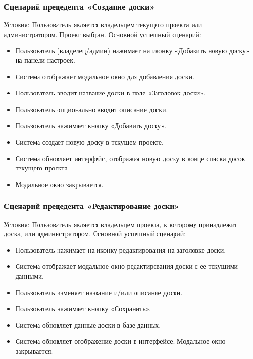 \subsubsection{Сценарий прецедента «Создание доски»}
Условия: Пользователь является владельцем текущего проекта или администратором. Проект выбран.
Основной успешный сценарий:
\begin{itemize}
	\item Пользователь (владелец/админ) нажимает на иконку «Добавить новую доску» на панели настроек.
	\item Система отображает модальное окно для добавления доски.
	\item Пользователь вводит название доски в поле «Заголовок доски».
	\item Пользователь опционально вводит описание доски.
	\item Пользователь нажимает кнопку «Добавить доску».
	\item Система создает новую доску в текущем проекте.
	\item Система обновляет интерфейс, отображая новую доску в конце списка досок текущего проекта.
	\item Модальное окно закрывается.
\end{itemize}

\subsubsection{Сценарий прецедента «Редактирование доски»}
Условия: Пользователь является владельцем проекта, к которому принадлежит доска, или администратором.
Основной успешный сценарий:
\begin{itemize}
	\item Пользователь нажимает на иконку редактирования на заголовке доски.
	\item Система отображает модальное окно редактирования доски с ее текущими данными.
	\item Пользователь изменяет название и/или описание доски.
	\item Пользователь нажимает кнопку «Сохранить».
	\item Система обновляет данные доски в базе данных.
	\item Система обновляет отображение доски в интерфейсе. Модальное окно закрывается.
\end{itemize}

